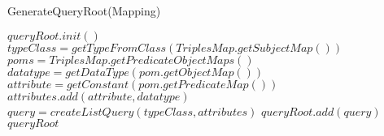 \begin{algorithm}
\caption{GenerateQueryRoot(Mapping)}
\label{algQueryRoot}
\begin{algorithmic}
\STATE $queryRoot.init()$
    \STATE $typeClass = getTypeFromClass(TriplesMap.getSubjectMap())$
    \STATE $poms = TriplesMap.getPredicateObjectMaps()$
      \STATE $datatype = getDataType(pom.getObjectMap())$
      \STATE $attribute = getConstant(pom.getPredicateMap())$   
      \STATE $attributes.add(attribute,datatype)$
    \ENDFOR
    \STATE $query = createListQuery(typeClass,attributes)$
    \STATE $queryRoot.add(query)$
\ENDFOR
\RETURN $queryRoot$ 
\end{algorithmic}
\end{algorithm}
